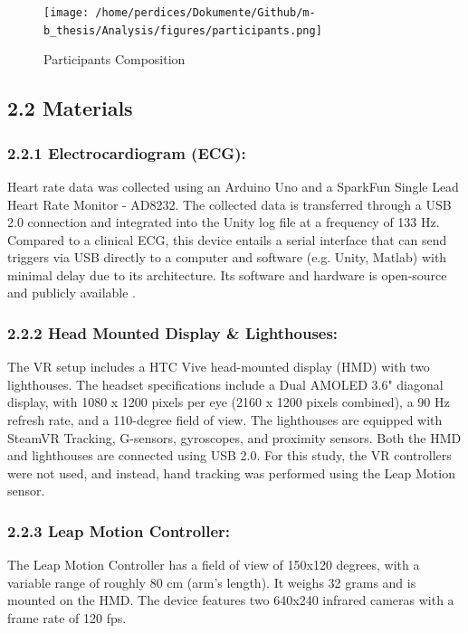 \documentclass[12pt,oneside,openright]{report}
\begin{document}
\begin{figure}[h]
    \centering
    \texttt{[image: /home/perdices/Dokumente/Github/m-b\_thesis/Analysis/figures/participants.png]}
    \caption{Participants Composition}
    \label{fig:mesh1}
\end{figure}

    
\subsection*{2.2 Materials}
\subsubsection*{2.2.1 Electrocardiogram (ECG):}
Heart rate data was collected using an Arduino Uno and a SparkFun Single Lead Heart Rate Monitor - AD8232. The collected data is transferred through a USB 2.0 connection and integrated into the Unity log file at a frequency of 133 Hz. Compared to a clinical ECG, this device entails a serial interface that can send triggers via USB directly to a computer and software (e.g. Unity, Matlab) with minimal delay due to its architecture. Its software and hardware is open-source and publicly available \parencite{TimsECG}.

\subsubsection*{2.2.2 Head Mounted Display \& Lighthouses:}
The VR setup includes a HTC Vive head-mounted display (HMD) with two lighthouses. The headset specifications include a Dual AMOLED 3.6" diagonal display, with 1080 x 1200 pixels per eye (2160 x 1200 pixels combined), a 90 Hz refresh rate, and a 110-degree field of view. The lighthouses are equipped with SteamVR Tracking, G-sensors, gyroscopes, and proximity sensors. Both the HMD and lighthouses are connected using USB 2.0. For this study, the VR controllers were not used, and instead, hand tracking was performed using the Leap Motion sensor.

\subsubsection*{2.2.3 Leap Motion Controller:}
The Leap Motion Controller has a field of view of 150x120 degrees, with a variable range of roughly 80 cm (arm's length). It weighs 32 grams and is mounted on the HMD. The device features two 640x240 infrared cameras with a frame rate of 120 fps.
\end{document}
